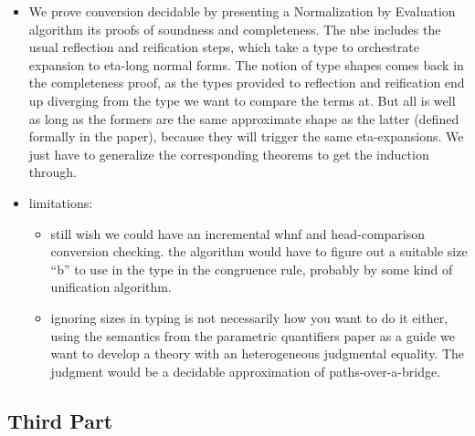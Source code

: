 \documentclass{book}
\begin{document}
\begin{itemize}
\begin{itemize}
   \item We prove conversion decidable by presenting a Normalization by
   Evaluation algorithm its proofs of soundness and completeness.
   The nbe includes the usual reflection and reification steps, which
   take a type to orchestrate expansion to eta-long normal forms.   
   The notion of type shapes comes back in the completeness proof, as
   the types provided to reflection and reification end up diverging
   from the type we want to compare the terms at. 
   But all is well as long as the formers are the same approximate
   shape as the latter (defined formally in the paper), because they
   will trigger the same eta-expansions.
   We just have to generalize the corresponding theorems to get the
   induction through.
   
 \item limitations:
     \begin{itemize}
     \item still wish we could have an incremental whnf and
     head-comparison conversion checking. the algorithm would have to
     figure out a suitable size ``b'' to use in the type in the
     congruence rule, probably by some kind of unification algorithm.
     
     \item ignoring sizes in typing is not necessarily how you want to do
     it either, using the semantics from the parametric quantifiers
     paper as a guide we want to develop a theory with an
     heterogeneous judgmental equality.
     The judgment would be a decidable approximation of
     paths-over-a-bridge.
     \end{itemize}
    \end{itemize}
    \end{itemize}
\subsection{Third Part}
\end{document}
